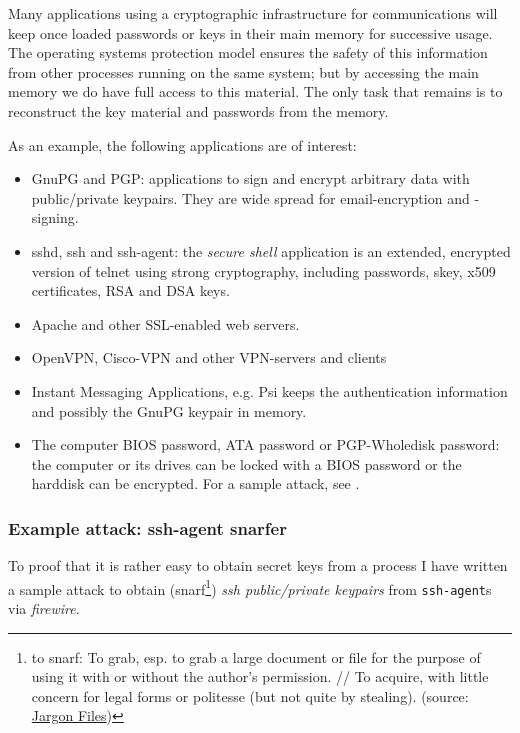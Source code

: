 Many applications using a cryptographic infrastructure for communications will
keep once loaded passwords or keys in their main memory for successive usage.
The operating systems protection model ensures the safety of this information
from other processes running on the same system; but by accessing the main
memory we do have full access to this material. The only task that remains is to
reconstruct the key material and passwords from the memory.

As an example, the following applications are of interest:

\begin{itemize}

	\item GnuPG and PGP: applications to sign and encrypt arbitrary data
	with public/private keypairs. They are wide spread for email-encryption
	and -signing.

	\item sshd, ssh and ssh-agent: the \emph{secure shell} application is an
	extended, encrypted version of telnet using strong cryptography,
	including passwords, skey, x509 certificates, RSA and DSA keys.

	\item Apache and other SSL-enabled web servers.

	\item OpenVPN, Cisco-VPN and other VPN-servers and clients

	\item Instant Messaging Applications, e.g. Psi keeps the authentication
	information and possibly the GnuPG keypair in memory.

	\item The computer BIOS password, ATA password or PGP-Wholedisk
		password: the computer or its drives can be locked with a BIOS
		password or the harddisk can be encrypted.  For a sample attack,
		see \cite{rux2k6firewire:2006}.

\end{itemize}


\subsubsection{Example attack: ssh-agent snarfer}

\label{ssh-agent-snarfer} To proof that it is rather easy to obtain secret keys
from a process I have written a sample attack to obtain
%
(snarf\footnote{to snarf: To grab, esp. to grab a large document or file for the
purpose of using it with or without the author's permission. // To acquire, with
little concern for legal forms or politesse (but not quite by stealing).
(source: \href{http://catb.org/jargon/html/S/snarf.html}{Jargon Files})})
%
\emph{ssh public/private keypairs} from \texttt{ssh-agent}s via \emph{firewire}.

